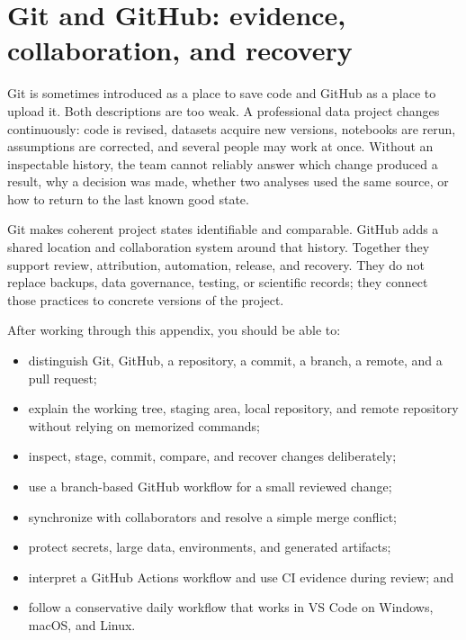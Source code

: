 \chapter{Git and GitHub: evidence, collaboration, and recovery}
\label{app:git-github}

Git is sometimes introduced as a place to save code and GitHub as a place to
upload it. Both descriptions are too weak. A professional data project changes
continuously: code is revised, datasets acquire new versions, notebooks are
rerun, assumptions are corrected, and several people may work at once. Without
an inspectable history, the team cannot reliably answer which change produced a
result, why a decision was made, whether two analyses used the same source, or
how to return to the last known good state.

Git makes coherent project states identifiable and comparable. GitHub adds a
shared location and collaboration system around that history. Together they
support review, attribution, automation, release, and recovery. They do not
replace backups, data governance, testing, or scientific records; they connect
those practices to concrete versions of the project.

\begin{learningobjectives}
After working through this appendix, you should be able to:
\begin{itemize}
  \item distinguish Git, GitHub, a repository, a commit, a branch, a remote,
  and a pull request;
  \item explain the working tree, staging area, local repository, and remote
  repository without relying on memorized commands;
  \item inspect, stage, commit, compare, and recover changes deliberately;
  \item use a branch-based GitHub workflow for a small reviewed change;
  \item synchronize with collaborators and resolve a simple merge conflict;
  \item protect secrets, large data, environments, and generated artifacts;
  \item interpret a GitHub Actions workflow and use CI evidence during review;
  and
  \item follow a conservative daily workflow that works in VS Code on Windows,
  macOS, and Linux.
\end{itemize}
\end{learningobjectives}

